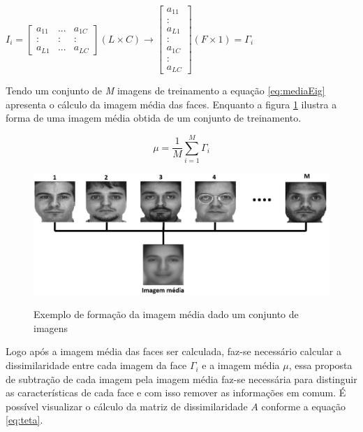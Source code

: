 $I_i = \begin{bmatrix}
 a_{11}  & ...  & a_{1C}\\ 
 : & : & :\\ 
 a_{L1}& ... &a_{LC} 
\end{bmatrix}(L \times C)
\rightarrow 
\begin{bmatrix}
a_{11} \\ 
 :\\ 
 a_{L1}\\
:\\
a_{1C}\\
:\\
a_{LC} 
 
\end{bmatrix} (F \times 1) = \Gamma_i $

Tendo um conjunto de \textit{M} imagens de treinamento a equação \ref{eq:mediaEig} apresenta o  cálculo da imagem média das faces. Enquanto a figura \ref{fig:imMedia} ilustra a forma de uma imagem média obtida de um conjunto de treinamento.

\begin{equation}
\mu = \frac{1}{M} \sum_{i=1}^{M} \Gamma_i 
\label{eq:mediaEig}
\end{equation}


\begin{figure}[H]
\centering
\caption{Exemplo de formação da imagem média dado um conjunto de imagens}
\includegraphics[scale = 0.50]{imgs3/imMedia.png}
\label{fig:imMedia}
\end{figure}




Logo após a imagem média das faces ser calculada, faz-se necessário calcular a dissimilaridade entre cada imagem da face $\Gamma_i$ e a imagem média $\mu$, essa proposta de subtração de cada imagem pela imagem média faz-se necessária para distinguir as características de cada face e com isso remover as informações em comum. É possível visualizar o cálculo da matriz de dissimilaridade $A$ conforme a equação \ref{eq:teta}.

